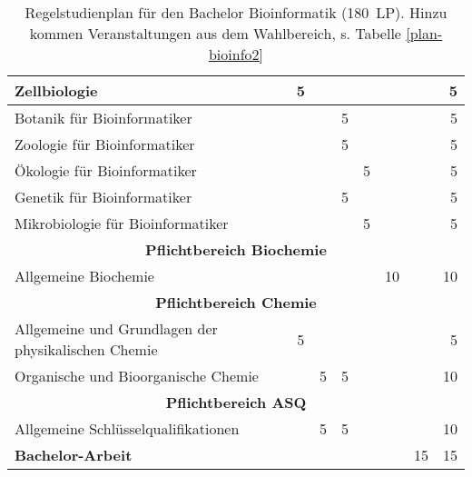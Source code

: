 \begin{table}[tbp]
\begin{small}
\begin{tabularx}{\textwidth}{|X||c|c|c|c|c|c||r|}
			Zellbiologie&5&&&&&&5\\\hline
			Botanik für Bioinformatiker&&&5&&&&5\\\hline
			Zoologie für Bioinformatiker&&&5&&&&5\\\hline
			Ökologie für Bioinformatiker&&&&5&&&5\\\hline
			Genetik für Bioinformatiker&&&5&&&&5\\\hline
			Mikrobiologie für Bioinformatiker&&&&5&&&5\\\hline\hline
			\multicolumn{8}{|c|}{\textbf{Pflichtbereich Biochemie}}\\\hline
			Allgemeine Biochemie&&&&&10&&10\\\hline\hline
			\multicolumn{8}{|c|}{\textbf{Pflichtbereich Chemie}}\\\hline
			Allgemeine und Grundlagen der physikalischen Chemie&5&&&&&&5\\\hline
			Organische und Bioorganische Chemie&&5&5&&&&10\\\hline\hline
			\multicolumn{8}{|c|}{\textbf{Pflichtbereich ASQ}}\\\hline
			Allgemeine Schlüsselqualifikationen&&5&5&&&&10\\\hline\hline
			\textbf{Bachelor-Arbeit}&&&&&&15&15\\\hline
		\end{tabularx}
	\end{small}
	\caption{Regelstudienplan für den Bachelor Bioinformatik (180~LP). Hinzu kommen Veranstaltungen aus dem Wahlbereich, s. Tabelle \ref{plan-bioinfo2} \label{plan-bioinfo}}
\end{table}

